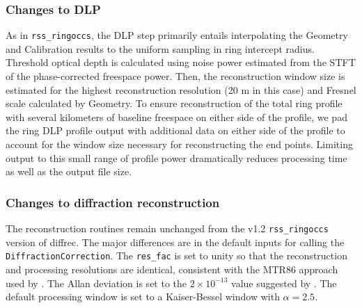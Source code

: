 \documentclass[titlepage, 12pt]{article}
\begin{document}
           \subsubsection{Changes to DLP}
           As in \texttt{rss\_ringoccs}, the DLP step primarily entails interpolating the Geometry and
           Calibration results to the uniform sampling in ring intercept radius. Threshold optical depth is
           calculated using noise power estimated from the STFT of the phase-corrected freespace power. 
           Then, the reconstruction window size is estimated for the highest reconstruction resolution (20 m in this case) and Fresnel scale calculated by Geometry. To ensure reconstruction of the total ring profile with several kilometers of baseline freespace on either side of the profile, we pad the ring DLP profile output with additional data on either side of the profile to account for the  window size necessary for reconstructing the end points. Limiting output to this small range of profile power dramatically reduces processing time as well as the output file size.
           \subsubsection{Changes to diffraction reconstruction}
           The reconstruction routines remain unchanged from the v1.2 \texttt{rss\_ringoccs} version of diffrec. The major differences are in the default inputs for calling the \texttt{DiffractionCorrection}. The \texttt{res\_fac} is set to unity so that the reconstruction and processing resolutions are identical, consistent with the MTR86 approach used by \citet{Gresh1989}. The Allan deviation is set to the $2\times10^{-13}$ value suggested by \citet{Gresh1989}. The default processing window is set to a Kaiser-Bessel window with $\alpha=2.5$.
\end{document}

